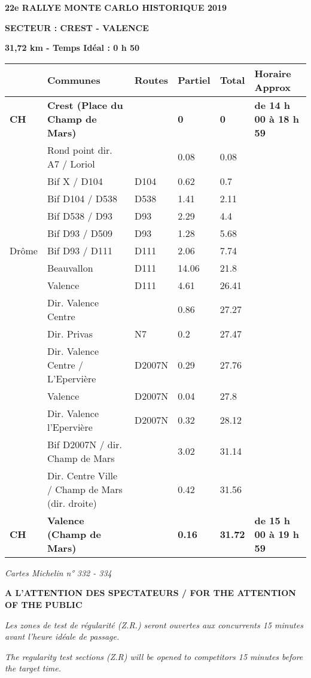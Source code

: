 \documentclass{article}%
\begin{document}
%
\normalsize%
\begin{center} \textbf{\LARGE{22e RALLYE MONTE CARLO HISTORIQUE 2019}} \end{center}%
\begin{flushleft} \textbf{SECTEUR : CREST - VALENCE
} \end{flushleft}%
\begin{flushright} \textbf{31,72 km - Temps Idéal : 0 h 50
} \end{flushright}%
\begin{longtable}{p{2.25cm}|p{7.0cm}|p{1.5cm}|p{1.5cm}|p{1.5cm}|p{3.5cm}}%
\hline%
&Communes&Routes&Partiel&Total&Horaire Approx\\%
\hline%
\endhead%
\endfoot%
\endlastfoot%
\textbf{﻿CH}&\textbf{Crest (Place du Champ de Mars)}& &\textbf{0}&\textbf{0}&\textbf{de 14 h 00 à 18 h 59
}\\%
 &Rond point dir. A7 / Loriol& &0.08&0.08& \\%
 &Bif X / D104&D104&0.62&0.7& \\%
 &Bif D104 / D538&D538&1.41&2.11& \\%
 &Bif D538 / D93&D93&2.29&4.4& \\%
 &Bif D93 / D509&D93&1.28&5.68& \\%
Drôme&Bif D93 / D111&D111&2.06&7.74& \\%
 &Beauvallon&D111&14.06&21.8& \\%
 &Valence&D111&4.61&26.41& \\%
 &Dir. Valence Centre& &0.86&27.27& \\%
 &Dir. Privas&N7&0.2&27.47& \\%
 &Dir. Valence Centre / L'Epervière&D2007N&0.29&27.76& \\%
 &Valence&D2007N&0.04&27.8& \\%
 &Dir. Valence l'Epervière&D2007N&0.32&28.12& \\%
 &Bif D2007N / dir. Champ de Mars& &3.02&31.14& \\%
 &Dir. Centre Ville / Champ de Mars (dir. droite)& &0.42&31.56& \\%
\textbf{CH}&\textbf{Valence (Champ de Mars)}& &\textbf{0.16}&\textbf{31.72}&\textbf{de 15 h 00 à 19 h 59}\\%
\hline%
\end{longtable}%
\begin{flushleft} \textit{Cartes Michelin n° 332 - 334
} \end{flushleft}%
\begin{center} \textbf{A L’ATTENTION DES SPECTATEURS / FOR THE ATTENTION OF THE PUBLIC} \end{center}%
\begin{center} \textit{Les zones de test de régularité (Z.R.) seront ouvertes aux concurrents 15 minutes avant l’heure idéale de passage.} \end{center}%
\begin{center} \textit{The regularity test sections (Z.R) will be opened to competitors 15 minutes before the target time.} \end{center}%
\end{document}
